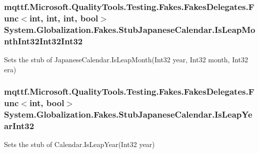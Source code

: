 \hypertarget{class_system_1_1_globalization_1_1_fakes_1_1_stub_japanese_calendar_a881990b2e554e0de19a3dc76a23b2a61}{
\subsubsection[{Is\-Leap\-Month\-Int32\-Int32\-Int32}]{\setlength{\rightskip}{0pt plus 5cm}mqttf.\-Microsoft.\-Quality\-Tools.\-Testing.\-Fakes.\-Fakes\-Delegates.\-Func$<$int, int, int, bool$>$ System.\-Globalization.\-Fakes.\-Stub\-Japanese\-Calendar.\-Is\-Leap\-Month\-Int32\-Int32\-Int32}}\label{class_system_1_1_globalization_1_1_fakes_1_1_stub_japanese_calendar_a881990b2e554e0de19a3dc76a23b2a61}


Sets the stub of Japanese\-Calendar.\-Is\-Leap\-Month(\-Int32 year, Int32 month, Int32 era)

\hypertarget{class_system_1_1_globalization_1_1_fakes_1_1_stub_japanese_calendar_ab1f0aa6c476804ff4102ee1860db8593}{
\subsubsection[{Is\-Leap\-Year\-Int32}]{\setlength{\rightskip}{0pt plus 5cm}mqttf.\-Microsoft.\-Quality\-Tools.\-Testing.\-Fakes.\-Fakes\-Delegates.\-Func$<$int, bool$>$ System.\-Globalization.\-Fakes.\-Stub\-Japanese\-Calendar.\-Is\-Leap\-Year\-Int32}}\label{class_system_1_1_globalization_1_1_fakes_1_1_stub_japanese_calendar_ab1f0aa6c476804ff4102ee1860db8593}


Sets the stub of Calendar.\-Is\-Leap\-Year(\-Int32 year)

